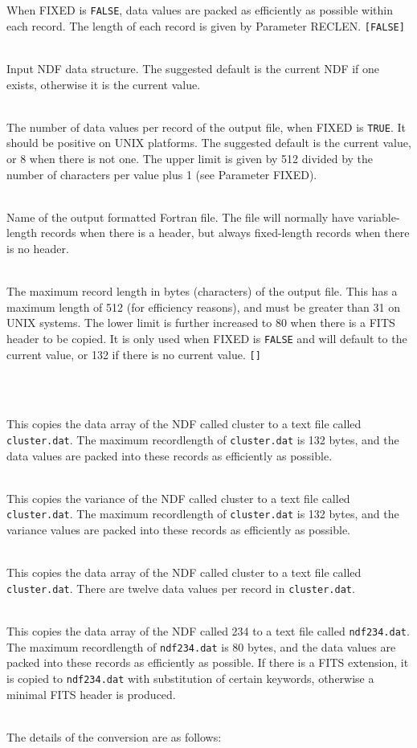 \documentclass[twoside,11pt]{article}
\newcommand{\htmlref}[2]{#1}
\newcommand{\latex}[1]{#1}
\newlength{\sstexampleslength}
\newcommand{\sstexamples}[1]{
   \goodbreak
   \item[Examples:] \mbox{} \\
   \vspace{-3.5ex}
   \begin{description}
      #1
   \end{description}
}
\newcommand{\sstsubsection}[1]{ \item[{#1}] \mbox{} \\}
\newcommand{\sstexamplesubsection}[2]{\sloppy
\item[\parbox{\sstexampleslength}{\ssttt #1}] \mbox{} \vspace{0.5ex}
\\ #2 \vspace{1.0ex}}
\newcommand{\sstnotes}[1]{\pagebreak[3] \item[Notes:] \mbox{} \\[1.3ex] #1}
\newcommand{\ssthitemlist}[1]{
  \latex{
  \mbox{} \\
  \vspace{-3.5ex}
  }
  \begin{itemize}
     #1
  \end{itemize}
}
\newcommand{\sstexamples}[1]{
   \item[\vspace{0.35ex}\htmlref{Examples:\vspace{-0.5ex}}{app_example}]
      \begin{description}
         #1
      \end{description}
      \\
   }
\newcommand{\sstsubsection}[1]{\item[{#1}]}
\newcommand{\sstexamplesubsection}[2]{
   \vspace{-1.0ex} \item[{\ssttt #1}] #2 \vspace{0.2ex}}
\newcommand{\sstnotes}[1]{\item[Notes:]
      \begin{description}
         #1
      \end{description}
   }
\begin{document}
{{{         When FIXED is \texttt{FALSE}, data values are packed as efficiently
         as possible within each record.  The length of each record is
         given by Parameter RECLEN.  \texttt{[FALSE]}
      }
      \sstsubsection{
         IN = NDF (Read)
      }{
         Input NDF data structure. The suggested default is the current
         NDF if one exists, otherwise it is the current value.
      }
      \sstsubsection{
         NOPEREC = \_INTEGER (Read)
      }{
         The number of data values per record of the output file, when
         FIXED is \texttt{TRUE}.  It should be positive on UNIX platforms.
         The suggested default is the current value, or 8 when there
         is not one.  The upper limit is given by 512 divided by the
         number of characters per value plus 1 (see Parameter FIXED).
      }
      \sstsubsection{
         OUT = FILENAME (Write)
      }{
         Name of the output formatted Fortran file.  The file will
         normally have variable-length records when there is a header,
         but always fixed-length records when there is no header.
      }
      \sstsubsection{
         RECLEN = \_INTEGER (Read)
      }{
         The maximum record length in bytes (characters) of the output
         file.  This has a maximum length of 512 (for efficiency
         reasons), and must be greater than 31 on UNIX systems.  The
         lower limit is further increased to 80 when there is a FITS
         header to be copied.  It is only used when FIXED is \texttt{FALSE} and
         will default to the current value, or 132 if there is no
         current value.  \texttt{[]}
      }
   }
   \sstexamples{
      \sstexamplesubsection{
         ndf2ascii cluster cluster.dat
      }{
         This copies the data array of the NDF called cluster to a text
         file called \texttt{cluster.dat}.  The maximum recordlength of
         \texttt{cluster.dat} is 132 bytes, and the data values are packed into
         these records as efficiently as possible.
      }
      \sstexamplesubsection{
         ndf2ascii cluster cluster.dat v
      }{
         This copies the variance of the NDF called cluster to a
         text file called \texttt{cluster.dat}.  The maximum recordlength of
         \texttt{cluster.dat} is 132 bytes, and the variance values are packed
         into these records as efficiently as possible.
      }
      \sstexamplesubsection{
         ndf2ascii cluster cluster.dat fixed noperec=12
      }{
         This copies the data array of the NDF called cluster to a
         text file called \texttt{cluster.dat}.  There are twelve data values
         per record in \texttt{cluster.dat}.
      }
      \sstexamplesubsection{
         ndf2ascii out=ndf234.dat fits reclen=80 in=@234
      }{
         This copies the data array of the NDF called 234 to a
         text file called \texttt{ndf234.dat}.  The maximum recordlength of
         \texttt{ndf234.dat} is 80 bytes, and the data values are packed into
         these records as efficiently as possible.  If there is a FITS
         extension, it is copied to \texttt{ndf234.dat} with substitution of
         certain keywords, otherwise a minimal FITS header is produced.
      }
   }
   \sstnotes{
      The details of the conversion are as follows:
      \ssthitemlist{

}}}
\end{document}
